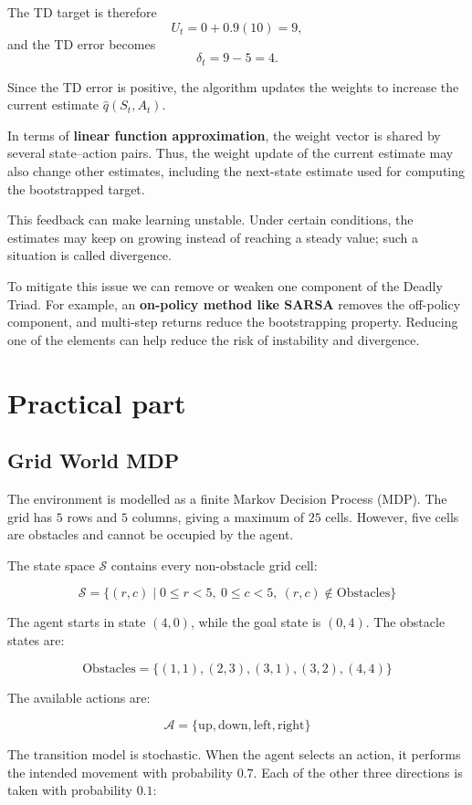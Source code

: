 \documentclass{scrartcl}
\theoremstyle{mytheoremstyle}
\theoremstyle{mytheoremstyle}
\theoremstyle{myproblemstyle}
\begin{document}
The TD target is therefore
\[
    U_t=0+0.9(10)=9,
\]
and the TD error becomes
\[
    \delta_t=9-5=4.
\]

Since the TD error is positive, the algorithm updates the weights to increase the current estimate $\hat q(S_t,A_t)$.

In terms of \textbf{linear function approximation}, the weight vector is shared by several state--action pairs. Thus, the weight update of the current estimate may also change other estimates, including the next-state estimate used for computing the bootstrapped target.

This feedback can make learning unstable. Under certain conditions, the estimates may keep on growing instead of reaching a steady value; such a situation is called divergence.

To mitigate this issue we can remove or weaken one component of the Deadly Triad. For example, an \textbf{on-policy method like SARSA} removes the off-policy component, and multi-step returns reduce the bootstrapping property. Reducing one of the elements can help reduce the risk of instability and divergence.

\section{Practical part}
\subsection{Grid World MDP}

The environment is modelled as a finite Markov Decision Process (MDP). The
grid has \(5\) rows and \(5\) columns, giving a maximum of \(25\) cells.
However, five cells are obstacles and cannot be occupied by the agent.

The state space \(\mathcal{S}\) contains every non-obstacle grid cell:

\[
    \mathcal{S} =
    \{(r,c) \mid 0 \leq r < 5,\ 0 \leq c < 5,\ (r,c) \notin \text{Obstacles}\}
\]

The agent starts in state \((4,0)\), while the goal state is \((0,4)\). The
obstacle states are:

\[
    \text{Obstacles} =
    \{(1,1), (2,3), (3,1), (3,2), (4,4)\}
\]

The available actions are:

\[
    \mathcal{A} =
    \{\text{up}, \text{down}, \text{left}, \text{right}\}
\]

The transition model is stochastic. When the agent selects an action, it
performs the intended movement with probability \(0.7\). Each of the other
three directions is taken with probability \(0.1\):
\end{document}

